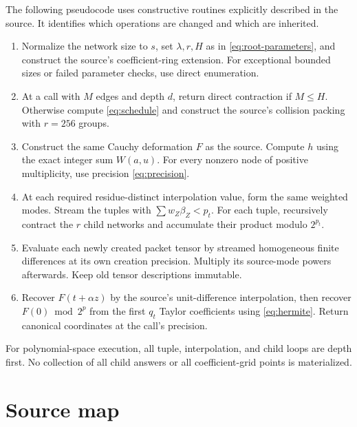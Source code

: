 \documentclass[11pt]{article}
\theoremstyle{remark}
\begin{document}
The following pseudocode uses constructive routines explicitly described in the source. It identifies which operations are changed and which are inherited.
\begin{enumerate}
\item Normalize the network size to $s$, set $\lambda,r,H$ as in \eqref{eq:root-parameters}, and construct the source's coefficient-ring extension. For exceptional bounded sizes or failed parameter checks, use direct enumeration.
\item At a call with $M$ edges and depth $d$, return direct contraction if $M\le H$. Otherwise compute \eqref{eq:schedule} and construct the source's collision packing with $r=256$ groups.
\item Construct the same Cauchy deformation $F$ as the source. Compute $h$ using the exact integer sum $W(a,u)$. For every nonzero node of positive multiplicity, use precision \eqref{eq:precision}.
\item At each required residue-distinct interpolation value, form the same weighted modes. Stream the tuples with $\sum w_Z\beta_Z<p_t$. For each tuple, recursively contract the $r$ child networks and accumulate their product modulo $2^{p_t}$.
\item Evaluate each newly created packet tensor by streamed homogeneous finite differences at its own creation precision. Multiply its source-mode powers afterwards. Keep old tensor descriptions immutable.
\item Recover $F(t+\alpha z)$ by the source's unit-difference interpolation, then recover $F(0)\bmod2^p$ from the first $q_t$ Taylor coefficients using \eqref{eq:hermite}. Return canonical coordinates at the call's precision.
\end{enumerate}

For polynomial-space execution, all tuple, interpolation, and child loops are depth first. No collection of all child answers or all coefficient-grid points is materialized.

\clearpage
\section{Source map}
\end{document}
